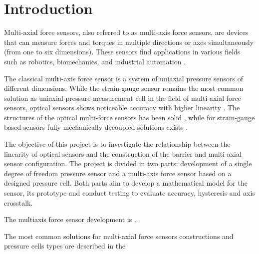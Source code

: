 \chapter{Introduction}
\label{chapter:introduction}


Multi-axial force sensors, also referred to as multi-axis force sensors, are devices that can measure forces and torques in multiple directions or axes simultaneously (from one to six dimensions). 
These sensors find applications in various fields such as robotics, biomechanics, and industrial automation \cite{multi_axis_force_sensors_review}. 


The classical multi-axis force sensor is a system of uniaxial pressure sensors of different dimensions.
While the strain-gauge sensor remains the most common solution as uniaxial pressure measurement cell in the field of multi-axial force sensors, 
optical sensors shows noticeable accuracy with higher linearity \cite{perfect_sensor}. 
The structures of the optical multi-force sensors has been solid \cite{perfect_sensor, 1990_optic}, while for strain-gauge based sensors fully mechanically decoupled solutions exists \cite{decoupling_sliding_structure, modal_sensor}. 

The objective of this project is to investigate the relationship between the linearity of optical sensors 
and the construction of the barrier and multi-axial sensor configuration.
The project is divided in two parts: development of a single degree of freedom pressure sensor and a multi-axis force sensor based on a designed pressure cell.
Both parts aim to develop a mathematical model for the sensor, its prototype and conduct testing to evaluate accuracy, hysteresis and axis crosstalk.

The multiaxis force sensor development is ...


The most common solutions for multi-axial force sensors constructions and pressure cells types are described in the  





